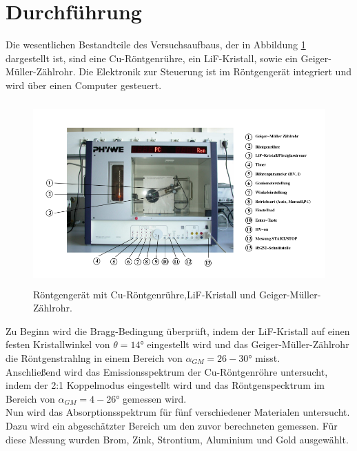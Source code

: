 \section{Durchführung}
\label{sec:Durchführung}

Die wesentlichen Bestandteile des Versuchsaufbaus, der in Abbildung
\ref{fig:aufbau} dargestellt ist, sind eine Cu-Röntgenrühre, ein
LiF-Kristall, sowie ein Geiger-Müller-Zählrohr.
Die Elektronik zur Steuerung ist im Röntgengerät integriert und
wird über einen Computer gesteuert.

\begin{figure}
  \centering
  \includegraphics[height=7cm]{aufbau.png}
  \caption{Röntgengerät mit Cu-Röntgenrühre,LiF-Kristall und Geiger-Müller-Zählrohr.}
  \label{fig:aufbau}
\end{figure}

Zu Beginn wird die Bragg-Bedingung überprüft, indem der LiF-Kristall auf einen
festen Kristallwinkel von $\theta=14°$ eingestellt wird und das Geiger-Müller-Zählrohr die
Röntgenstrahlng in einem Bereich von $\alpha_{GM}=26-30°$ misst.\\

Anschließend wird das Emissionsspektrum der Cu-Röntgenröhre untersucht, indem
der 2:1 Koppelmodus eingestellt wird und das Röntgenspecktrum im Bereich von
$\alpha_{GM}=4-26°$ gemessen wird.\\

Nun wird das Absorptionsspektrum für fünf verschiedener Materialen untersucht.
Dazu wird ein abgeschätzter Bereich um den zuvor berechneten gemessen.
Für diese Messung wurden Brom, Zink, Strontium, Aluminium und Gold ausgewählt.\\
